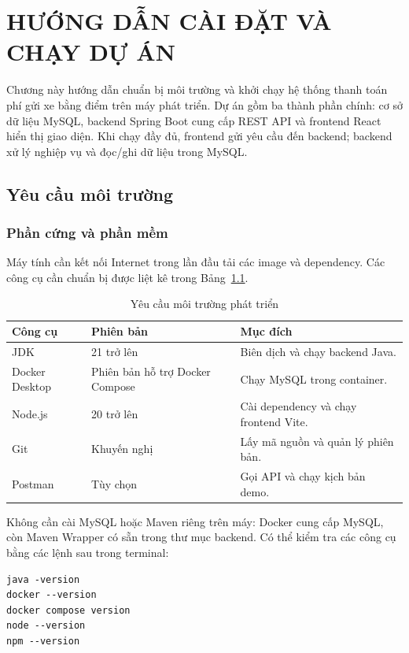 \chapter{HƯỚNG DẪN CÀI ĐẶT VÀ CHẠY DỰ ÁN}

Chương này hướng dẫn chuẩn bị môi trường và khởi chạy hệ thống thanh toán phí gửi xe bằng điểm trên máy phát triển. Dự án gồm ba thành phần chính: cơ sở dữ liệu MySQL, backend Spring Boot cung cấp REST API và frontend React hiển thị giao diện. Khi chạy đầy đủ, frontend gửi yêu cầu đến backend; backend xử lý nghiệp vụ và đọc/ghi dữ liệu trong MySQL.

\section{Yêu cầu môi trường}

\subsection{Phần cứng và phần mềm}
Máy tính cần kết nối Internet trong lần đầu tải các image và dependency. Các công cụ cần chuẩn bị được liệt kê trong Bảng~\ref{tab:installation-requirements}.

\begin{table}[htbp]
\centering
\caption{Yêu cầu môi trường phát triển}
\label{tab:installation-requirements}
\begin{tabular}{|p{3.5cm}|p{3cm}|p{6.5cm}|}
\hline
\textbf{Công cụ} & \textbf{Phiên bản} & \textbf{Mục đích} \\ \hline
JDK & 21 trở lên & Biên dịch và chạy backend Java. \\ \hline
Docker Desktop & Phiên bản hỗ trợ Docker Compose & Chạy MySQL trong container. \\ \hline
Node.js & 20 trở lên & Cài dependency và chạy frontend Vite. \\ \hline
Git & Khuyến nghị & Lấy mã nguồn và quản lý phiên bản. \\ \hline
Postman & Tùy chọn & Gọi API và chạy kịch bản demo. \\ \hline
\end{tabular}
\end{table}

Không cần cài MySQL hoặc Maven riêng trên máy: Docker cung cấp MySQL, còn Maven Wrapper có sẵn trong thư mục backend. Có thể kiểm tra các công cụ bằng các lệnh sau trong terminal:
\begin{verbatim}
java -version
docker --version
docker compose version
node --version
npm --version
\end{verbatim}

